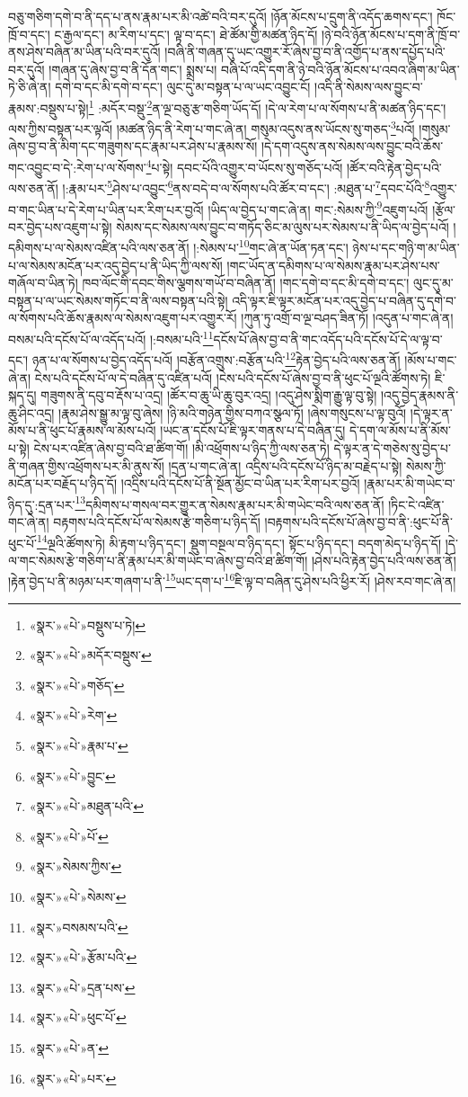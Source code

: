 བཅུ་གཅིག་དགེ་བ་ནི་དད་པ་ནས་རྣམ་པར་མི་འཚེ་བའི་བར་དུའོ། །ཉོན་མོངས་པ་དྲུག་ནི་འདོད་ཆགས་དང་། ཁོང་ཁྲོ་བ་དང་། ང་རྒྱལ་དང་། མ་རིག་པ་དང་། ལྟ་བ་དང་། ཐེ་ཚོམ་གྱི་མཚན་ཉིད་དོ། །ཉེ་བའི་ཉོན་མོངས་པ་དག་ནི་ཁྲོ་བ་ནས་ཤེས་བཞིན་མ་ཡིན་པའི་བར་དུའོ། །བཞི་ནི་གཞན་དུ་ཡང་འགྱུར་རོ་ཞེས་བྱ་བ་ནི་འགྱོད་པ་ནས་དཔྱོད་པའི་བར་དུའོ། །གཞན་དུ་ཞེས་བྱ་བ་ནི་དོན་གང་། སྨྲས་པ། བཞི་པོ་འདི་དག་ནི་ཉེ་བའི་ཉོན་མོངས་པ་འབའ་ཞིག་མ་ཡིན་ཏེ་ཅི་ཞེ་ན། དགེ་བ་དང་མི་དགེ་བ་དང་། ལུང་དུ་མ་བསྟན་པ་ལ་ཡང་འབྱུང་ངོ། །འདི་ནི་སེམས་ལས་བྱུང་བ་རྣམས་:བསྡུས་པ་སྟེ།\footnote{«སྣར་»«པེ་»བསྡུས་པ་ཏེ།} :མདོར་བསྡུ་\footnote{«སྣར་»«པེ་»མདོར་བསྡུས་}ན་ལྔ་བཅུ་རྩ་གཅིག་ཡོད་དོ། །དེ་ལ་རེག་པ་ལ་སོགས་པ་ནི་མཚན་ཉིད་དང་། ལས་ཀྱིས་བསྟན་པར་ལྟའོ། །མཚན་ཉིད་ནི་རེག་པ་གང་ཞེ་ན། གསུམ་འདུས་ནས་ཡོངས་སུ་གཅད་\footnote{«སྣར་»«པེ་»གཅོད་}པའོ། །གསུམ་ཞེས་བྱ་བ་ནི་མིག་དང་གཟུགས་དང་རྣམ་པར་ཤེས་པ་རྣམས་སོ། །དེ་དག་འདུས་ནས་སེམས་ལས་བྱུང་བའི་ཆོས་གང་འབྱུང་བ་དེ་:རེག་པ་ལ་སོགས་\footnote{«སྣར་»«པེ་»རེག་}པ་སྟེ། དབང་པོའི་འགྱུར་བ་ཡོངས་སུ་གཅོད་པའོ། །ཚོར་བའི་རྟེན་བྱེད་པའི་ལས་ཅན་ནོ། །:རྣམ་པར་\footnote{«སྣར་»«པེ་»རྣམ་པ་}ཤེས་པ་འབྱུང་\footnote{«སྣར་»«པེ་»བྱུང་}ནས་བདེ་བ་ལ་སོགས་པའི་ཚོར་བ་དང་། :མཐུན་པ་\footnote{«སྣར་»«པེ་»མཐུན་པའི་}དབང་པོའི་\footnote{«སྣར་»«པེ་»པོ་}འགྱུར་བ་གང་ཡིན་པ་དེ་རེག་པ་ཡིན་པར་རིག་པར་བྱའོ། །ཡིད་ལ་བྱེད་པ་གང་ཞེ་ན། གང་:སེམས་ཀྱི་\footnote{«སྣར་»སེམས་ཀྱིས་}འཇུག་པའོ། །རྩོལ་བར་བྱེད་པས་འཇུག་པ་སྟེ། སེམས་དང་སེམས་ལས་བྱུང་བ་གཏོད་ཅིང་མ་ལུས་པར་སེམས་པ་ནི་ཡིད་ལ་བྱེད་པའོ། །དམིགས་པ་ལ་སེམས་འཛིན་པའི་ལས་ཅན་ནོ། །:སེམས་པ་\footnote{«སྣར་»«པེ་»སེམས་}གང་ཞེ་ན་ཡོན་ཏན་དང་། ཉེས་པ་དང་གཉི་ག་མ་ཡིན་པ་ལ་སེམས་མངོན་པར་འདུ་བྱེད་པ་ནི་ཡིད་ཀྱི་ལས་སོ། །གང་ཡོད་ན་དམིགས་པ་ལ་སེམས་རྣམ་པར་ཤེས་པས་གཞོལ་བ་ཡིན་ཏེ། ཁབ་ལོང་གི་དབང་གིས་ལྕགས་གཡོ་བ་བཞིན་ནོ། །གང་དགེ་བ་དང་མི་དགེ་བ་དང་། ལུང་དུ་མ་བསྟན་པ་ལ་ཡང་སེམས་གཏོང་བ་ནི་ལས་བསྟན་པའི་སྟེ། འདི་ལྟར་ཇི་ལྟར་མངོན་པར་འདུ་བྱེད་པ་བཞིན་དུ་དགེ་བ་ལ་སོགས་པའི་ཆོས་རྣམས་ལ་སེམས་འཇུག་པར་འགྱུར་རོ། །ཀུན་ཏུ་འགྲོ་བ་ལྔ་བཤད་ཟིན་ཏོ། །འདུན་པ་གང་ཞེ་ན། བསམ་པའི་དངོས་པོ་ལ་འདོད་པའོ། །:བསམ་པའི་\footnote{«སྣར་»བསམས་པའི་}དངོས་པོ་ཞེས་བྱ་བ་ནི་གང་འདོད་པའི་དངོས་པོ་དེ་ལ་ལྟ་བ་དང་། ཉན་པ་ལ་སོགས་པ་བྱེད་འདོད་པའོ། །བརྩོན་འགྲུས་:བརྩོན་པའི་\footnote{«སྣར་»«པེ་»རྩོམ་པའི་}རྟེན་བྱེད་པའི་ལས་ཅན་ནོ། །མོས་པ་གང་ཞེ་ན། ངེས་པའི་དངོས་པོ་ལ་དེ་བཞིན་དུ་འཛིན་པའོ། །ངེས་པའི་དངོས་པོ་ཞེས་བྱ་བ་ནི་ཕུང་པོ་ལྔའི་ཚོགས་ཏེ། ཇི་སྐད་དུ། གཟུགས་ནི་དབུ་བ་རྡོས་པ་འདྲ། །ཚོར་བ་ཆུ་ཡི་ཆུ་བུར་འདྲ། །འདུ་ཤེས་སྨིག་རྒྱུ་ལྟ་བུ་སྟེ། །འདུ་བྱེད་རྣམས་ནི་ཆུ་ཤིང་འདྲ། །རྣམ་ཤེས་སྒྱུ་མ་ལྟ་བུ་ཞེས། །ཉི་མའི་གཉེན་གྱིས་བཀའ་སྩལ་ཏོ། །ཞེས་གསུངས་པ་ལྟ་བུའོ། །དེ་ལྟར་ན་མོས་པ་ནི་ཕུང་པོ་རྣམས་ལ་མོས་པའོ། །ཡང་ན་དངོས་པོ་ཇི་ལྟར་གནས་པ་དེ་བཞིན་དུ། དེ་དག་ལ་མོས་པ་ནི་མོས་པ་སྟེ། ངེས་པར་འཛིན་ཞེས་བྱ་བའི་ཐ་ཚིག་གོ། །མི་འཕྲོགས་པ་ཉིད་ཀྱི་ལས་ཅན་ཏེ། དེ་ལྟར་ན་དེ་གཅེས་སུ་བྱེད་པ་ནི་གཞན་གྱིས་འཕྲོགས་པར་མི་ནུས་སོ། །དྲན་པ་གང་ཞེ་ན། འདྲིས་པའི་དངོས་པོ་ཉིད་མ་བརྗེད་པ་སྟེ། སེམས་ཀྱི་མངོན་པར་བརྗོད་པ་ཉིད་དོ། །འདྲིས་པའི་དངོས་པོ་ནི་སྔོན་མྱོང་བ་ཡིན་པར་རིག་པར་བྱའོ། །རྣམ་པར་མི་གཡེང་བ་ཉིད་དུ་:དྲན་པར་\footnote{«སྣར་»«པེ་»དྲན་པས་}དམིགས་པ་གསལ་བར་གྱུར་ན་སེམས་རྣམ་པར་མི་གཡེང་བའི་ལས་ཅན་ནོ། །ཏིང་ངེ་འཛིན་གང་ཞེ་ན། བརྟགས་པའི་དངོས་པོ་ལ་སེམས་རྩེ་གཅིག་པ་ཉིད་དོ། །བརྟགས་པའི་དངོས་པོ་ཞེས་བྱ་བ་ནི་:ཕུང་པོ་ནི་ཕུང་པོ་\footnote{«སྣར་»«པེ་»ཕུང་པོ་}ལྔའི་ཚོགས་ཏེ། མི་རྟག་པ་ཉིད་དང་། སྡུག་བསྔལ་བ་ཉིད་དང་། སྟོང་པ་ཉིད་དང་། བདག་མེད་པ་ཉིད་དོ། །དེ་ལ་གང་སེམས་རྩེ་གཅིག་པ་ནི་རྣམ་པར་མི་གཡེང་བ་ཞེས་བྱ་བའི་ཐ་ཚིག་གོ། །ཤེས་པའི་རྟེན་བྱེད་པའི་ལས་ཅན་ནོ། །རྟེན་བྱེད་པ་ནི་མཉམ་པར་གཞག་པ་ནི་\footnote{«སྣར་»«པེ་»ན་}ཡང་དག་པ་\footnote{«སྣར་»«པེ་»པར་}ཇི་ལྟ་བ་བཞིན་དུ་ཤེས་པའི་ཕྱིར་རོ། །ཤེས་རབ་གང་ཞེ་ན། 